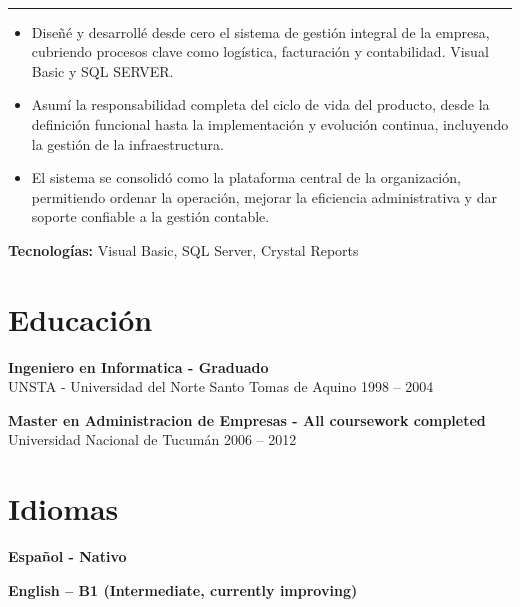 \documentclass[10pt,a4paper]{article}
\begin{document}
\\[-3pt]
{\rule{\textwidth}{0.25pt}}
\begin{itemize}
    \item Diseñé y desarrollé desde cero el sistema de gestión integral de la empresa, cubriendo procesos clave como logística, facturación y contabilidad. Visual Basic y SQL SERVER.
    \item Asumí la responsabilidad completa del ciclo de vida del producto, desde la definición funcional hasta la implementación y evolución continua, incluyendo la gestión de la infraestructura.
    \item El sistema se consolidó como la plataforma central de la organización, permitiendo ordenar la operación, mejorar la eficiencia administrativa y dar soporte confiable a la gestión contable.
\end{itemize}
\vspace{2pt}
{\small \textbf{Tecnologías:} Visual Basic, SQL Server, Crystal Reports}

\vspace{3pt}

\section*{Educación}

\textbf{Ingeniero en Informatica - Graduado} \\
UNSTA - Universidad del Norte Santo Tomas de Aquino \hfill 1998 – 2004 \\

\vspace{1pt}

\textbf{Master en Administracion de Empresas - All coursework completed} \\
Universidad Nacional de Tucumán \hfill 2006 – 2012

\vspace{3pt}

\section*{Idiomas}

\textbf{Español - Nativo} \\

\vspace{1pt}

\textbf{English – B1 (Intermediate, currently improving)} \\
\end{document}
